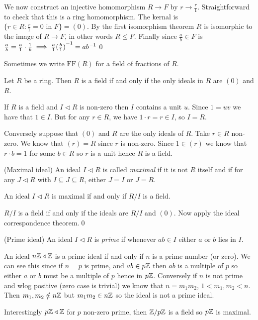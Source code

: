 \documentclass{article}
\newcommand{\nrm}{\triangleleft}
\begin{document}
We now construct an injective homomorphism $ R\to F $ by $ r\to \frac r1 $. Straightforward to check that this is a ring homomorphism. The kernal is $ \{r\in R: \frac r1 = 0 \text { in } F\} =(0)$. By the first isomorphism theorem $ R $ is isomorphic to the image of $ R\to F $, in other words $ R\le F $.
Finally since $ \frac ab\in F $ is $ \frac ab= \frac a1\cdot \frac 1b\implies \frac a1{(\frac b1)}^{-1}=a{b}^{-1} $\qed

Sometimes we write $ \mathrm{FF}(R) $ for a field of fractions of $ R $.
\begin{proposition}
  Let $ R $ be a ring. Then $ R $ is a field if and only if the only ideals in $ R $ are $ (0) $ and $ R $.
\end{proposition}
\pf If $ R $ is a field and $ I\nrm R $ is non-zero then $ I $ contains a unit $ u $. Since $ 1=uv $ we have that $ 1\in I $. But for any $ r\in R $, we have $ 1\cdot r =r\in I $, so $ I=R $.\par
Conversely suppose that $ (0) $ and $ R $ are the only ideals of $ R $. Take $ r\in R $ non-zero. We know that $ (r)=R $ since $ r $ is non-zero. Since $ 1\in (r) $ we know that $ r\cdot b = 1 $ for some $ b\in R $ so $ r $ is a unit hence $ R $ is a field.

\begin{definition}
	(Maximal ideal) An ideal $ I\nrm R $ is called \textit{maximal} if it is not $ R $ itself and if for any $ J\nrm R $ with $ I\subseteq J\subseteq R $, either $ J=I $ or $ J=R $.
\end{definition}

\begin{proposition}
  An ideal $ I\nrm R $ is maximal if and only if $ R/I $ is a field.
\end{proposition}
\pf $ R/I $ is a field if and only if the ideals are $ R/I $ and $ (0) $. Now apply the ideal correspondence theorem.\qed
\begin{definition}
	(Prime ideal) An ideal $ I\nrm R $ is \textit{prime} if whenever $ ab\in I $ either $ a $ or $ b $ lies in $ I $.
\end{definition}
An ideal $ n\Z\nrm \Z $ is a prime ideal if and only if $ n $ is a prime number (or zero). We can see this since if $ n=p $ is prime, and $ ab\in p\mathbb{Z} $ then $ ab $ is a multiple of $ p $ so either $ a $ or $ b $ must be a multiple of $ p $ hence in $ p\mathbb{Z} $. Conversely if $ n $ is not prime and wlog positive (zero case is trivial) we know that $ n=m_1m_2 $, $ 1<m_1,m_2<n $. Then $ m_1,m_2\notin n\mathbb{Z} $ but $ m_1m_2\in n\mathbb{Z} $ so the ideal is not a prime ideal.
\par Interestingly $ p\Z\nrm \Z $ for $ p $ non-zero prime, then $ \mathbb{Z}/p\mathbb{Z} $ is a field so $ p\mathbb{Z} $ is maximal.
\end{document}
